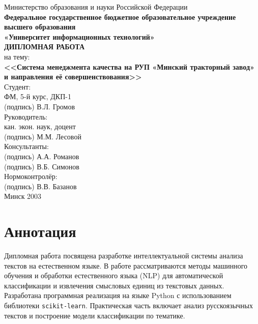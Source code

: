 \documentclass[14pt,a4paper]{extarticle}
\begin{document}
\begin{titlepage}
    \centering
    \large
    Министерство образования и науки Российской Федерации\\
    \textbf{Федеральное государственное бюджетное образовательное учреждение высшего образования}\\
    \textbf{«Университет информационных технологий»}\\[2cm]

    \textbf{\Large ДИПЛОМНАЯ РАБОТА}\\[0.5cm]
    на тему:\\[0.3cm]
    \textbf{<<Система менеджмента качества на РУП «Минский тракторный завод» и направления её совершенствования>>}\\[4cm]

    Студент:\\
    ФМ, 5-й курс, ДКП-1\\
    (подпись) В.Л. Громов\\[1cm]

    Руководитель:\\
    кан. экон. наук, доцент\\
    (подпись) М.М. Лесовой\\[1cm]

    Консультанты:\\
    (подпись) А.А. Романов\\
    (подпись) В.Б. Симонов\\[1cm]

    Нормоконтролёр:\\
    (подпись) В.В. Базанов\\[3cm]

    Минск 2003
\end{titlepage}

\tableofcontents
\newpage

\section*{Аннотация}
Дипломная работа посвящена разработке интеллектуальной системы анализа текстов на естественном языке.
В работе рассматриваются методы машинного обучения и обработки естественного языка (NLP) для автоматической классификации и извлечения смысловых единиц из текстовых данных.
Разработана программная реализация на языке Python с использованием библиотеки \texttt{scikit-learn}.
Практическая часть включает анализ русскоязычных текстов и построение модели классификации по тематике.
\end{document}
